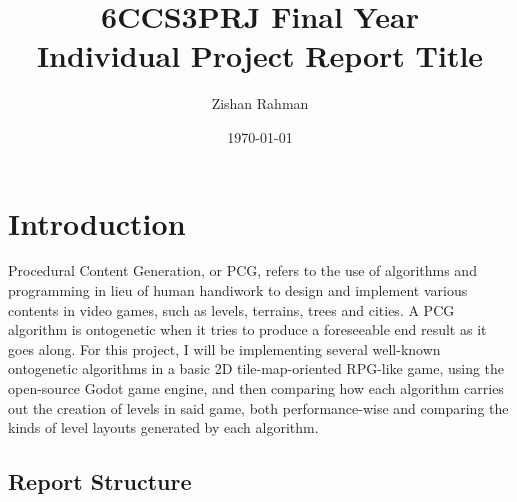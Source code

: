 \documentclass[11pt]{informatics-report}
\title{6CCS3PRJ Final Year\\\vspace{0.2cm}Individual Project Report Title}
\author{Zishan Rahman}
\date{\today}
\begin{document}
\createFrontMatter
\onehalfspacing
\tableofcontents
\doublespacing


\chapter{Introduction}

Procedural Content Generation, or PCG, refers to the use of algorithms and programming in lieu of human handiwork to design and implement various contents in video games, such as levels, terrains, trees and cities. A PCG algorithm is ontogenetic when it tries to produce a foreseeable end result as it goes along. For this project, I will be implementing several well-known ontogenetic algorithms in a basic 2D tile-map-oriented RPG-like game, using the open-source Godot game engine, and then comparing how each algorithm carries out the creation of levels in said game, both performance-wise and comparing the kinds of level layouts generated by each algorithm.

\section{Report Structure}












\appendix



\end{document}

